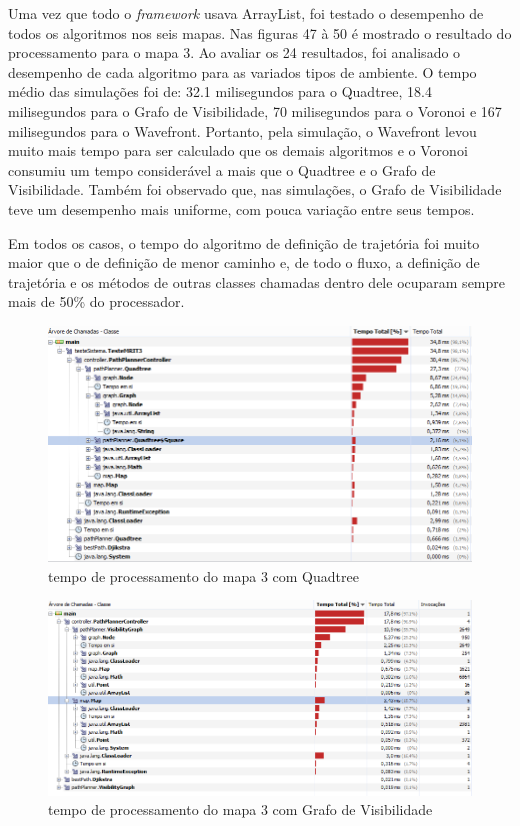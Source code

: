 Uma vez que todo o \textit{framework} usava ArrayList, foi testado o desempenho de todos os algoritmos nos seis mapas. Nas figuras 47 à 50 é mostrado o resultado do processamento para o mapa 3. Ao avaliar os 24 resultados, foi analisado o desempenho de cada algoritmo para as variados tipos de ambiente. O tempo médio das simulações foi de: 32.1 milisegundos para o Quadtree, 18.4 milisegundos para o Grafo de Visibilidade, 70 milisegundos para o Voronoi e 167 milisegundos para o Wavefront. Portanto, pela simulação, o Wavefront levou muito mais tempo para ser calculado que os demais algoritmos e o Voronoi consumiu um tempo considerável a mais que o Quadtree e o Grafo de Visibilidade. Também foi observado que, nas simulações, o Grafo de Visibilidade teve um desempenho mais uniforme, com pouca variação entre seus tempos.

Em todos os casos, o tempo do algoritmo de definição de trajetória foi muito maior que o de definição de menor caminho e, de todo o fluxo, a definição de trajetória e os métodos de outras classes chamadas dentro dele ocuparam sempre mais de 50\% do processador.

\begin{figure}[h]
	\centering
	\label{fig47}
		\includegraphics[keepaspectratio=true,scale=0.6]{figuras/quad3.PNG}
	\caption{tempo de processamento do mapa 3 com Quadtree}
\end{figure}

\begin{figure}[H]
	\centering
	\label{fig48}
		\includegraphics[keepaspectratio=true,scale=0.6]{figuras/visib3.PNG}
	\caption{tempo de processamento do mapa 3 com Grafo de Visibilidade}
\end{figure}


